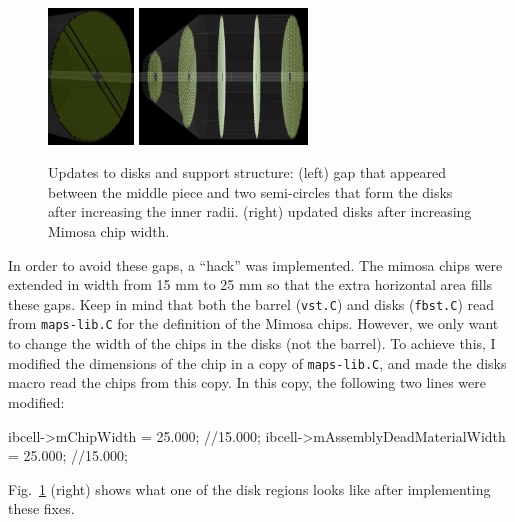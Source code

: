 \documentclass[12pt]{article}
\begin{document}
\begin{figure}[H]
\centering
\includegraphics[width=0.203\textwidth]{figures/disk_gap.png}
\includegraphics[width=0.4\textwidth]{figures/updated_disks.png}
\caption{Updates to disks and support structure: (left) gap that appeared between the middle piece and two semi-circles that
form the disks after increasing the inner radii. (right) updated disks after increasing Mimosa chip width.}
\label{fig:new_disks}
\end{figure}

In order to avoid these gaps, a ``hack'' was implemented. The mimosa chips were extended in width from 15 mm to 25 mm
so that the extra horizontal area fills these gaps.
Keep in mind that both the barrel (\verb|vst.C|) and disks (\verb|fbst.C|) read from \verb|maps-lib.C| for the definition of
the Mimosa chips. However, we only want to change the width of the chips in the disks (not the barrel). To achieve this,
I modified the dimensions of the chip in a copy of \verb|maps-lib.C|, and made the disks macro read the chips from this copy.
In this copy, the following two lines were modified:

\begin{tcolorbox}
\begin{verbnobox}[\scriptsize]
ibcell->mChipWidth                   =   25.000;  //15.000;
ibcell->mAssemblyDeadMaterialWidth   =   25.000;  //15.000;
\end{verbnobox}  
\end{tcolorbox}

Fig.~\ref{fig:new_disks} (right) shows what one of the disk regions looks like after implementing these fixes.
\end{document}
